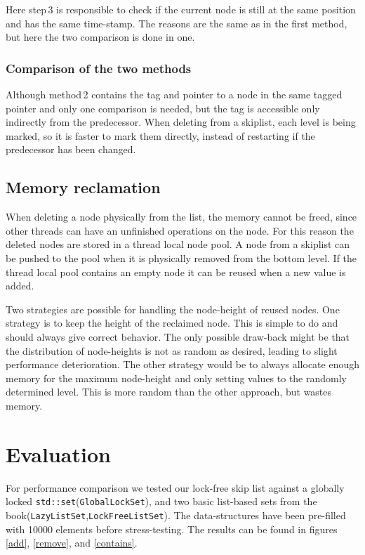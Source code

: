 \documentclass{article}
\begin{document}
Here step\,3 is responsible to check if the current node is still at the same position and has the same time-stamp.
The reasons are the same as in the first method, but here the two comparison is done in one.

\subsubsection*{Comparison of the two methods}

Although method\,2 contains the tag and pointer to a node in the same tagged pointer and only one comparison is needed, but the tag is accessible only indirectly from the predecessor.
When deleting from a skiplist, each level is being marked, so it is faster to mark them directly, instead of restarting if the predecessor has been changed. 

\subsection*{Memory reclamation}

When deleting a node physically from the list, the memory cannot be freed, since other threads can have an unfinished operations on the node.
For this reason the deleted nodes are stored in a thread local node pool.
A node from a skiplist can be pushed to the pool when it is physically removed from the bottom level.
If the thread local pool contains an empty node it can be reused when a new value is added.

Two strategies are possible for handling the node-height of reused nodes.
One strategy is to keep the height of the reclaimed node.
This is simple to do and should always give correct behavior.
The only possible draw-back might be that the distribution of node-heights is not as random as desired, leading to slight performance deterioration.
The other strategy would be to always allocate enough memory for the maximum node-height and only setting values to the randomly determined level.
This is more random than the other approach, but wastes memory.

\section*{Evaluation}

For performance comparison we tested our lock-free skip list against a globally locked \texttt{std::set}(\texttt{GlobalLockSet}), and two basic list-based sets from the book(\texttt{LazyListSet},\texttt{LockFreeListSet}).
The data-structures have been pre-filled with 10000 elements before stress-testing.
The results can be found in figures \ref{add}, \ref{remove}, and \ref{contains}.
\end{document}
